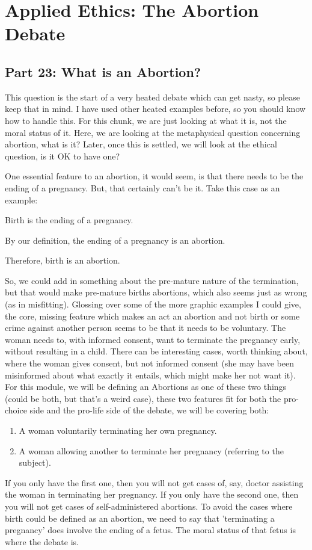 \part{Applied Ethics: The Abortion Debate}
\label{ch.mod8}

\chapter{Part 23: What is an Abortion?}

This question is the start of a very heated debate which can get nasty, so please keep that in mind. I have used other heated examples before, so you should know how to handle this. For this chunk, we are just looking at what it is, not the moral status of it. Here, we are looking at the metaphysical question concerning abortion, what is it? Later, once this is settled, we will look at the ethical question, is it OK to have one? 

One essential feature to an abortion, it would seem, is that there needs to be the ending of a pregnancy. But, that certainly can't be it. Take this case as an example:
\begin{earg}
    \item[] Birth is the ending of a pregnancy. 
    \item[] By our definition, the ending of a pregnancy is an abortion. 
    \item[Therefore,] birth is an abortion.
\end{earg}
So, we could add in something about the pre-mature nature of the termination, but that would make pre-mature births abortions, which also seems just as wrong (as in misfitting). Glossing over some of the more graphic examples I could give, the core, missing feature which makes an act an abortion and not birth or some crime against another person seems to be that it needs to be voluntary. The woman needs to, with informed consent, want to terminate the pregnancy early, without resulting in a child. There can be interesting cases, worth thinking about, where the woman gives consent, but not informed consent (she may have been misinformed about what exactly it entails, which might make her not want it).   For this module, we will be defining an \glspl{Abortion} as one of these two things (could be both, but that's a weird case), these two features fit for both the pro-choice side and the pro-life side of the debate, we will be covering both:
\begin{enumerate}
\item A woman voluntarily terminating her own pregnancy.  	
\item A woman allowing another to terminate her pregnancy (referring to the subject).
\end{enumerate}
If you only have the first one, then you will not get cases of, say, doctor assisting the woman in terminating her pregnancy. If you only have the second one, then you will not get cases of self-administered abortions.  To avoid the cases where birth could be defined as an abortion, we need to say that 'terminating a pregnancy' does involve the ending of a fetus. The moral status of that fetus is where the debate is.  

